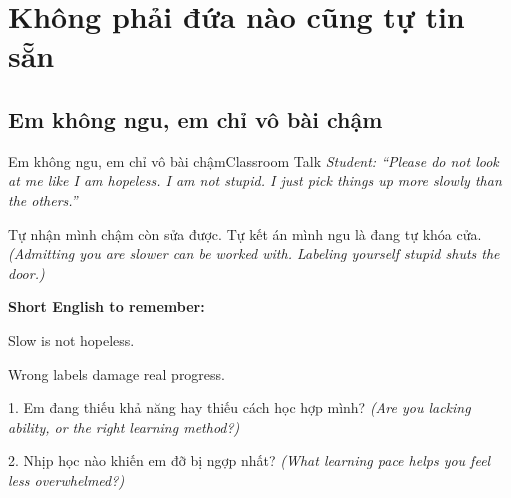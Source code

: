 \chapter{Không phải đứa nào cũng tự tin sẵn}

\section{Em không ngu, em chỉ vô bài chậm}
\begin{truyen}{Em không ngu, em chỉ vô bài chậm}{Classroom Talk}
\textit{Student: ``Please do not look at me like I am hopeless. I am not stupid. I just pick things up more slowly than the others.''}\\[4pt]



\end{truyen}

\begin{baihoc}
Tự nhận mình chậm còn sửa được. Tự kết án mình ngu là đang tự khóa cửa.
\textit{(Admitting you are slower can be worked with. Labeling yourself stupid shuts the door.)}
\end{baihoc}

\begin{ghinhoanh}
\textbf{Short English to remember:}

Slow is not hopeless.

Wrong labels damage real progress.
\end{ghinhoanh}

\begin{tuhocnhanh}
1. Em đang thiếu khả năng hay thiếu cách học hợp mình? \textit{(Are you lacking ability, or the right learning method?)}

2. Nhịp học nào khiến em đỡ bị ngợp nhất? \textit{(What learning pace helps you feel less overwhelmed?)}
\end{tuhocnhanh}
\ngancach

